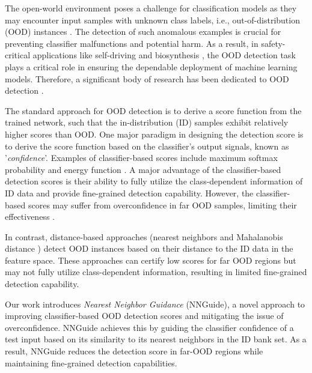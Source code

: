 \documentclass[10pt,twocolumn,letterpaper]{article}
\begin{document}
The open-world environment poses a challenge for classification models as they may encounter input samples with unknown class labels, i.e., out-of-distribution (OOD) instances \cite{yang2022openood,pu2021anomaly,wu2021learning,bao2021evidential,chan2021entropy,hendrycks2021natural}. The detection of such anomalous examples is crucial for preventing classifier malfunctions and potential harm. As a result, in safety-critical applications like self-driving \cite{ren2021safety,chitta2021neat,vojir2021road,jung2021standardized} and biosynthesis \cite{zheng2022deep,vamathevan2019applications}, the OOD detection task plays a critical role in ensuring the dependable deployment of machine learning models. Therefore, a significant body of research has been dedicated to OOD detection \cite{yang2021generalized}.

The standard approach for OOD detection is to derive a score function from the trained network, such that the in-distribution (ID) samples exhibit relatively higher scores than OOD. One major paradigm in designing the detection score is to derive the score function based on the classifier's output signals, known as '\textit{confidence}'. Examples of classifier-based scores include maximum softmax probability \cite{hendrycks2016baseline} and energy function \cite{liu2020energy}. A major advantage of the classifier-based detection scores is their ability to fully utilize the class-dependent information of ID data and provide fine-grained detection capability. However, the classifier-based scores may suffer from overconfidence in far OOD samples, limiting their effectiveness \cite{fang2022out,hein2019relu}.

In contrast, distance-based approaches (\eg nearest neighbors \cite{sun2022out} and Mahalanobis distance \cite{lee2018simple,sehwag2021ssd}) detect OOD instances based on their distance to the ID data in the feature space. These approaches can certify low scores for far OOD regions but may not fully utilize class-dependent information, resulting in limited fine-grained detection capability. 



Our work introduces \textit{Nearest Neighbor Guidance} (NNGuide), a novel approach to improving classifier-based OOD detection scores and mitigating the issue of overconfidence. NNGuide achieves this by guiding the classifier confidence of a test input based on its similarity to its nearest neighbors in the ID bank set. As a result, NNGuide reduces the detection score in far-OOD regions while maintaining fine-grained detection capabilities.
\end{document}
